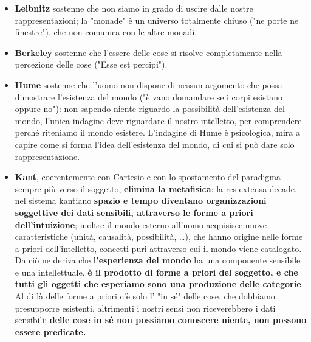 \begin{itemize}
	\item \textbf{Leibnitz} sostenne che non siamo in grado di uscire dalle nostre rappresentazioni; la "monade" è un universo totalmente chiuso ("ne porte ne finestre"), che non comunica con le altre monadi.
	\item \textbf{Berkeley} sostenne che l'essere delle cose si risolve completamente nella percezione delle cose ("Esse est percipi").
	\item \textbf{Hume} sostenne che l'uomo non dispone di nessun argomento che possa dimostrare l'esistenza del mondo ("è vano domandare se i corpi esistano oppure no"): non sapendo niente riguardo la possibilità dell'esistenza del mondo, l'unica indagine deve riguardare il nostro intelletto, per comprendere perché riteniamo il mondo esistere. L'indagine di Hume è psicologica, mira a capire come si forma l'idea dell'esistenza del mondo, di cui si può dare solo rappresentazione.
	\item \textbf{Kant}, coerentemente con Cartesio e con lo spostamento del paradigma sempre più verso il soggetto, \textbf{elimina la metafisica}: la res extensa decade, nel sistema kantiano \textbf{spazio e tempo diventano organizzazioni soggettive dei dati sensibili, attraverso le forme a priori dell'intuizione}; inoltre il mondo esterno all'uomo acquisisce nuove caratteristiche (unità, causalità, possibilità, \dots), che hanno origine nelle forme a priori dell'intelletto, concetti puri attraverso cui il mondo viene catalogato. Da ciò ne deriva che \textbf{l'esperienza del mondo} ha una componente sensibile e una intellettuale, \textbf{è il prodotto di forme a priori del soggetto, e che tutti gli oggetti che esperiamo sono una produzione delle categorie}. Al di là delle forme a priori c'è solo l' "in sé" delle cose, che dobbiamo presupporre esistenti, altrimenti i nostri sensi non riceverebbero i dati sensibili; \textbf{delle cose in sé non possiamo conoscere niente, non possono essere predicate.}
\end{itemize}

